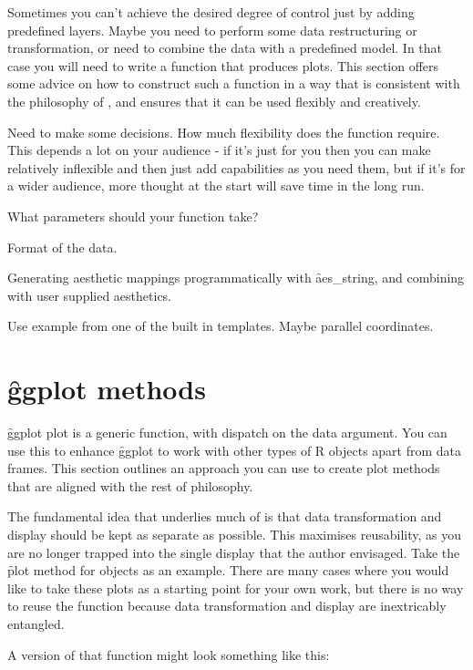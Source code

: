 Sometimes you can't achieve the desired degree of control just by adding predefined layers.  Maybe you need to perform some data restructuring or transformation, or need to combine the data with a predefined model.  In that case you will need to write a function that produces \ggplot plots.  This section offers some advice on how to construct such a function in a way that is consistent with the philosophy of \ggplot, and ensures that it can be used flexibly and creatively.

Need to make some decisions.  How much flexibility does the function require.  This depends a lot on your audience - if it's just for you then you can make relatively inflexible and then just add capabilities as you need them, but if it's for a wider audience, more thought at the start will save time in the long run.

What parameters should your function take?

Format of the data.

Generating aesthetic mappings programmatically with \f{aes_string}, and combining with user supplied aesthetics.

Use example from one of the built in templates.  Maybe parallel coordinates.

\section{\f{ggplot} methods}
\label{sec:methods}

\f{ggplot} plot is a generic function, with dispatch on the data argument.  You can use this to enhance \f{ggplot} to work with other types of R objects apart from data frames.  This section outlines an approach you can use to create plot methods that are aligned with the rest of \ggplot philosophy.

The fundamental idea that underlies much of \ggplot is that data transformation and display should be kept as separate as possible.  This maximises reusability, as you are no longer trapped into the single display that the author envisaged.  Take the \f{plot} method for  objects as an example.  There are many cases where you would like to take these plots as a starting point for your own work, but there is no way to reuse the function because data transformation and display are inextricably entangled.

A \ggplot version of that function might look something like this:




